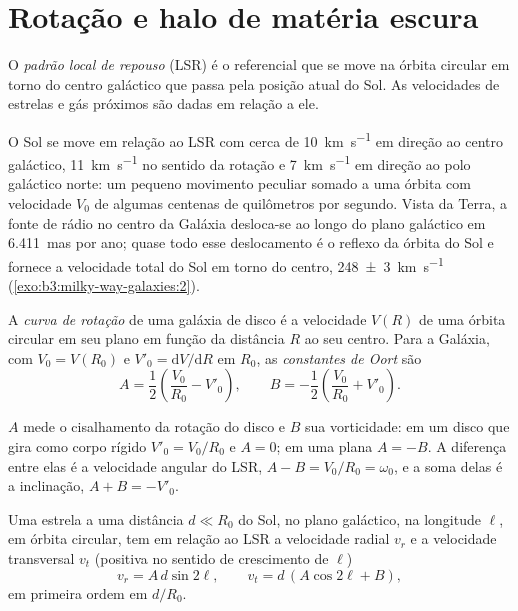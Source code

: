 \section{Rotação e halo de matéria escura}\label{sec:b3:milky-way-galaxies:rotation}

\begin{definition}\label{def:b3:milky-way-galaxies:lsr}
O \emph{padrão local de repouso} (LSR) é
o referencial que se move na órbita circular em torno do centro galáctico que
passa pela posição atual do Sol. As velocidades de estrelas e gás próximos
são dadas em relação a ele.
\end{definition}

O Sol se move em relação ao LSR com cerca de \qty{10}{km.s^{-1}} em direção ao
centro galáctico, \qty{11}{km.s^{-1}} no sentido da rotação e
\qty{7}{km.s^{-1}} em direção ao polo galáctico norte: um pequeno movimento peculiar
somado a uma órbita com velocidade $V_0$ de algumas centenas de quilômetros
por segundo. Vista da Terra, a fonte de rádio no centro da
Galáxia desloca-se ao longo do plano galáctico em \qty{6.411}{mas} por ano; quase
todo esse deslocamento é o reflexo da órbita do Sol e fornece a
velocidade total do Sol em torno do centro, \qty[separate-uncertainty=true]{248 \pm 3}{km.s^{-1}}
(\cref{exo:b3:milky-way-galaxies:2}).

\begin{definition}\label{def:b3:milky-way-galaxies:rotation-curve}
A \emph{curva de rotação} de uma galáxia de disco é a
velocidade $V(R)$ de uma órbita circular em seu plano em função da
distância $R$ ao seu centro. Para a Galáxia, com $V_0 = V(R_0)$ e
$V'_0 = \mathrm{d}V/\mathrm{d}R$ em $R_0$, as \emph{constantes de
Oort} são
\[
A = \frac12\left(\frac{V_0}{R_0} - V'_0\right), \qquad
B = -\frac12\left(\frac{V_0}{R_0} + V'_0\right).
\]
\end{definition}

$A$ mede o cisalhamento da rotação do disco e $B$ sua vorticidade: em um
disco que gira como corpo rígido $V'_0 = V_0/R_0$ e $A = 0$; em uma  plana $A = -B$. A diferença entre elas é a velocidade angular do LSR,
$A - B = V_0/R_0 = \omega_0$, e a soma delas é a inclinação, $A + B = -V'_0$.

\begin{theorem}\label{thm:b3:milky-way-galaxies:oort}
Uma estrela a uma distância $d \ll R_0$ do Sol, no plano galáctico, na
longitude $\ell$, em órbita circular, tem em relação ao LSR a velocidade radial
$v_r$ e a velocidade transversal $v_t$ (positiva no
sentido de crescimento de $\ell$)
\[
v_r = A\,d\sin 2\ell, \qquad v_t = d\,(A\cos 2\ell + B),
\]
em primeira ordem em $d/R_0$.
\end{theorem}


